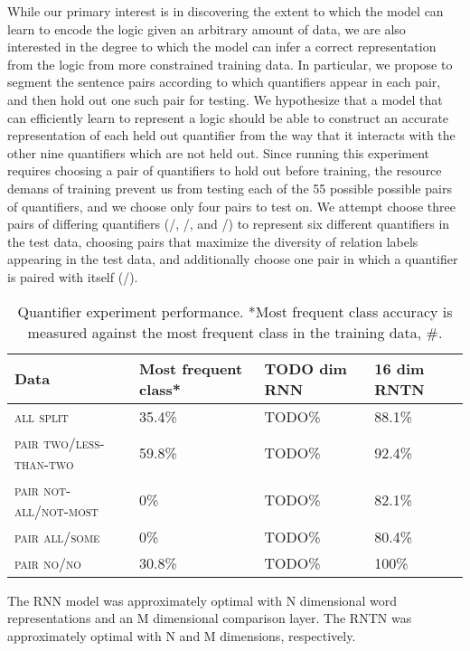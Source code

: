 While our primary interest is in discovering the extent to which the model can learn to encode the logic given an arbitrary amount of data, we are also interested in the degree to which the model can infer a correct representation from the logic from more constrained training data. In particular, we propose to segment the sentence pairs according to which quantifiers appear in each pair, and then hold out one such pair for testing. We hypothesize that a model that can efficiently learn to represent a logic should be able to construct an accurate representation of each held out quantifier from the way that it interacts with the other nine quantifiers which are not held out. Since running this experiment requires choosing a pair of quantifiers to hold out before training, the resource demans of training prevent us from testing each of the 55 possible possible pairs of quantifiers, and we choose only four pairs to test on. We attempt choose three pairs of differing quantifiers (/, /, and /) to represent six different quantifiers in the test data, choosing pairs that maximize the diversity of relation labels appearing in the test data, and additionally choose one pair in which a quantifier is paired with itself (/).

\begin{table}\small\centering
\begin{tabular}{|l|lll|}\hline
\textbf{Data} & \textbf{Most frequent class*} & \textbf{TODO dim RNN} & \textbf{16 dim RNTN}\\\hline
\textsc{all split}	& 35.4\% &	TODO\%&	88.1\% \\\hline
\textsc{pair two/less-than-two}	& 59.8\% &	TODO\% &	92.4\% \\
\textsc{pair not-all/not-most}	&0\% &	   TODO\%  &	82.1\% \\
\textsc{pair all/some}	& 0\%& TODO\%  &	80.4\% \\
\textsc{pair no/no}	& 30.8\% &	TODO\% &	100\% \\
\hline
\end{tabular}

\caption{Quantifier experiment performance. *Most frequent class accuracy is measured against the most frequent class in the training data, \#.\label{resultstable}}
\end{table} %

The RNN model was approximately optimal with N dimensional word representations and an M dimensional comparison layer. The RNTN was approximately optimal with N and M dimensions, respectively.

